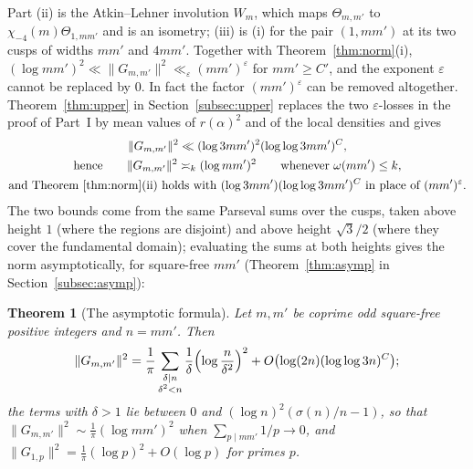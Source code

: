﻿\documentclass[11pt]{amsart}
\newtheorem{theorem}{Theorem}[section]
\theoremstyle{remark}
\newcommand{\e}{\varepsilon}
\begin{document}
Part (ii) is the Atkin--Lehner involution $W_m$, which maps $\Theta_{m,m'}$ to $\chi_{-4}(m)\Theta_{1,mm'}$ and is an isometry; (iii) is (i) for the pair $(1,mm')$ at its two cusps of widths $mm'$ and $4mm'$. Together with Theorem~\ref{thm:norm}(i), $(\log mm')^2\ll\|G_{m,m'}\|^2\ll_\e(mm')^\e$ for $mm'\ge C'$, and the exponent $\e$ cannot be replaced by $0$. In fact the factor $(mm')^\e$ can be removed altogether. Theorem~\ref{thm:upper} in Section~\ref{subsec:upper} replaces the two $\e$-losses in the proof of Part~I by mean values of $r(\alpha)^2$ and of the local densities and gives
\begin{gather*}
\|G_{m,m'}\|^2\ll(\log3mm')^2(\log\log3mm')^{C},\\
\text{hence}\qquad \|G_{m,m'}\|^2\asymp_k(\log mm')^2\qquad\text{whenever }\omega(mm')\le k,\\
\text{and Theorem~\ref{thm:norm}(ii) holds with }(\log3mm')(\log\log3mm')^{C}\text{ in place of }(mm')^\e .
\end{gather*}
The two bounds come from the same Parseval sums over the cusps, taken above height $1$ (where the regions are disjoint) and above height $\sqrt3/2$ (where they cover the fundamental domain); evaluating the sums at both heights gives the norm asymptotically, for square-free $mm'$ (Theorem~\ref{thm:asymp} in Section~\ref{subsec:asymp}):

\begin{theorem}[The asymptotic formula]\label{thm:asympintro}
Let $m,m'$ be coprime odd square-free positive integers and $n=mm'$. Then
\[
\|G_{m,m'}\|^2=\frac1\pi\sum_{\substack{\delta\mid n\\ \delta^2<n}}\frac1\delta\Bigl(\log\frac n{\delta^2}\Bigr)^2+O\bigl(\log(2n)(\log\log3n)^{C}\bigr);
\]
the terms with $\delta>1$ lie between $0$ and $(\log n)^2(\sigma(n)/n-1)$, so that $\|G_{m,m'}\|^2\sim\frac1\pi(\log mm')^2$ when $\sum_{p\mid mm'}1/p\to0$, and $\|G_{1,p}\|^2=\frac1\pi(\log p)^2+O(\log p)$ for primes $p$.
\end{theorem}
\end{document}
